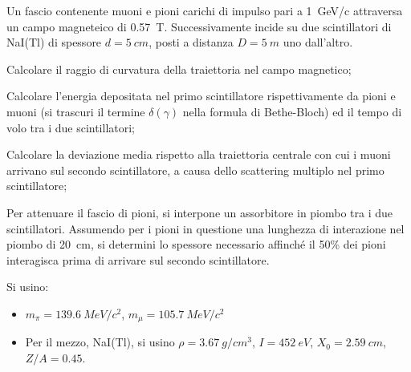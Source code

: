 \begin{Exercise}[title={Spettrometro, ionizzazione, multiplo scattering, assorbimento}]
Un fascio contenente muoni e pioni carichi di impulso pari a \SI{1}{GeV/c} attraversa un campo magneteico di \SI{0.57}{T}. Successivamente incide su due scintillatori di NaI(Tl) di spessore $d = \SI{5}{cm}$, posti a distanza $D = \SI{5}{m}$ uno dall’altro.

\Question Calcolare il raggio di curvatura della traiettoria nel campo magnetico;

\Question Calcolare l’energia depositata nel primo scintillatore rispettivamente da pioni e muoni (si trascuri il termine $\delta(\gamma)$ nella formula di Bethe-Bloch) ed il tempo di volo tra i due scintillatori;

\Question Calcolare la deviazione media rispetto alla traiettoria centrale con cui i muoni arrivano sul secondo scintillatore, a causa dello scattering multiplo nel primo scintillatore;

\Question Per attenuare il fascio di pioni, si interpone un assorbitore in piombo tra i due scintillatori. Assumendo per i pioni in questione una lunghezza di interazione nel piombo di \SI{20}{cm}, si determini lo spessore necessario affinch\'e il 50\% dei pioni interagisca prima di arrivare sul secondo scintillatore.

Si usino:
\begin{itemize}
\item $m_\pi=\SI{139.6}{MeV/c^2}$, $m_\mu = \SI{105.7}{MeV/c^2}$
\item Per il mezzo, NaI(Tl), si usino  $\rho = \SI{3.67}{g/cm^3}$, $I = \SI{452}{eV}$, $X_0 = \SI{2.59}{cm}$, $Z/A = 0.45$.
\end{itemize}
\end{Exercise}
